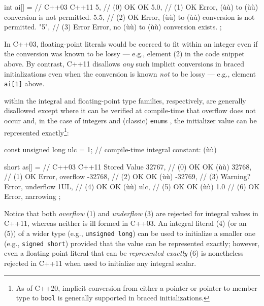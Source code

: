 \begin{emcppslisting}
int ai[] =  //      C++03    C++11
{
    5,      // (0)   OK       OK
    5.0,    // (1)   OK      Error, (ù{}ù) to (ù{}ù) conversion is not permitted.
    5.5,    // (2)   OK      Error, (ù{}ù) to (ù{}ù) conversion is not permitted.
    "5",    // (3)  Error    Error, no (ù{}ù) to (ù{}ù) conversion exists.
};
\end{emcppslisting}


\noindent In C++03, floating-point literals would be coerced to fit within an
integer even if the conversion was known to be lossy --- e.g., element
(2) in the code snippet above. By contrast, C++11 disallows \emph{any}
such implicit conversions in braced initializations even when the
conversion is known \emph{not} to be lossy --- e.g., element
\lstinline!ai[1]! above.

 within the integral and floating-point
type families, respectively, are generally disallowed except where it
can be verified at compile-time that overflow does not occur and, in the
case of integers and (classic) \lstinline!enum!s , the initializer value
can be represented exactly{\cprotect\footnote{As of C++20, implicit
conversion from either a pointer or pointer-to-member type to
  \lstinline!bool! is generally supported in braced initializations.}}:

\begin{emcppslisting}
const unsigned long ulc = 1;  // compile-time integral constant: (ù{}ù)

short as[] =  //       C++03     C++11                        Stored Value
{
     32767,   // (0)     OK        OK                        (ù{}ù)
     32768,   // (1)     OK      Error, overflow
    -32768,   // (2)     OK        OK                        (ù{}ù)
    -32769,   // (3)   Warning?  Error, underflow
    1UL,      // (4)     OK        OK                        (ù{}ù)
    ulc,      // (5)     OK        OK                        (ù{}ù)
    1.0       // (6)     OK      Error, narrowing
};
\end{emcppslisting}


\noindent Notice that both \emph{overflow} (1) and \emph{underflow} (3) are
rejected for integral values in C++11, whereas neither is ill formed in
C++03. An integral literal (4) (or an  (5)) of
a wider type (e.g., \lstinline!unsigned!~\lstinline!long!) can be used to
initialize a smaller one (e.g., \lstinline!signed!~\lstinline!short!) provided
that the value can be represented exactly; however, even a floating
point literal that can be \emph{represented exactly} (6) is nonetheless
rejected in C++11 when used to initialize any integral scalar.

